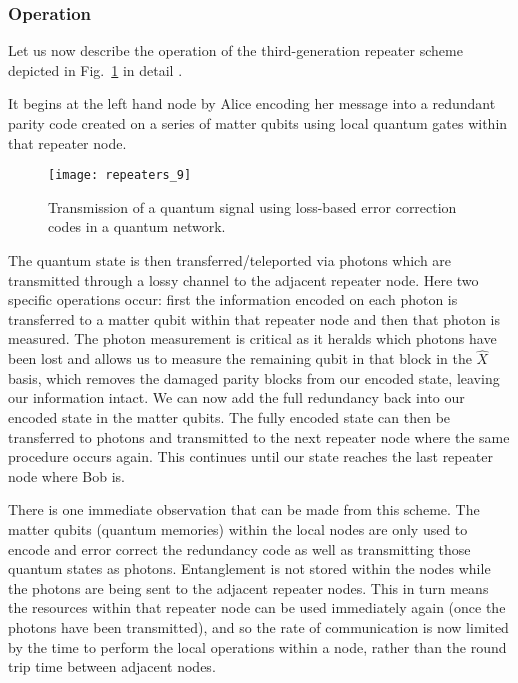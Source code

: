 \subsubsection{Operation}

Let us now describe the operation of the third-generation repeater scheme  depicted in Fig.~\ref{fig:repeaters_9} in detail \cite{bib:munro12, bib:MKLLJ14}.

It begins at the left hand node by Alice encoding her message into a redundant parity code created on a series of matter qubits using local quantum gates within that repeater node.

\begin{figure}[!htbp]
\texttt{[image: repeaters\_9]}
\captionspacefig \caption{Transmission of a quantum signal using loss-based error correction codes in a quantum network.}\label{fig:repeaters_9}
\end{figure}

The quantum state is then transferred/teleported via photons which are transmitted through a lossy channel to the adjacent repeater node. Here two specific operations occur: first the information encoded on each photon is transferred to a matter qubit within that repeater node and then that photon is measured. The photon measurement is critical as it heralds which photons have been lost and allows us to measure the remaining qubit in that block in the $\hat{X}$ basis, which removes the damaged parity blocks from our encoded state, leaving our information intact. We can now add the full redundancy back into our encoded state in the matter qubits. The fully encoded state can then be transferred to photons and transmitted to the next repeater node where the same procedure occurs again. This continues until our state reaches the last repeater node where Bob is.

There is one immediate observation that can be made from this scheme. The matter qubits (quantum memories) within the local nodes are only used to encode and error correct the redundancy code as well as transmitting those quantum states as photons. Entanglement is not stored within the nodes while the photons are being sent to the adjacent repeater nodes. This in turn means the resources within that repeater node can be used immediately again (once the photons have been transmitted), and so the rate of communication is now limited by the time to perform the local operations within a node, rather than the round trip time between adjacent nodes. 

